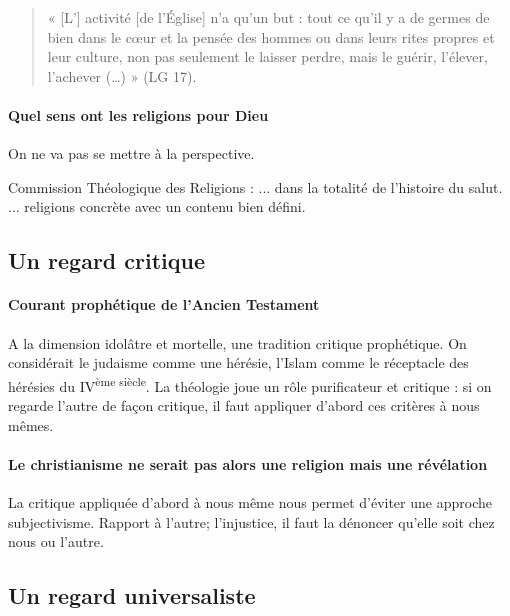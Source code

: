 \begin{quote}
    
« [L’] activité [de l’Église] n’a qu’un but : tout ce qu’il y a de germes de bien dans le cœur et la
pensée des hommes ou dans leurs rites propres et leur culture, non pas seulement le laisser perdre,
mais le guérir, l’élever, l’achever (…) » (LG 17).
\end{quote}

\paragraph{Quel sens ont les religions pour Dieu} On ne va pas se mettre à la perspective.

Commission Théologique des Religions  : ... dans la totalité de l'histoire du salut. ... religions concrète avec un contenu bien défini. 

\subsection{Un regard critique}


\paragraph{Courant prophétique de l'Ancien Testament} A la dimension idolâtre et mortelle, une tradition critique prophétique.
On considérait le judaisme comme une hérésie, l'Islam comme le réceptacle des hérésies du IV\textsuperscript{ème siècle}. La théologie joue un rôle purificateur et critique : si on regarde l'autre de façon critique, il faut appliquer d'abord ces critères à nous mêmes.

\paragraph{Le christianisme ne serait pas alors une religion mais une révélation}  La critique appliquée d'abord à nous même nous permet d'éviter une approche subjectivisme. Rapport à l'autre; l'injustice, il faut la dénoncer qu'elle soit chez nous ou l'autre.

\subsection{Un regard universaliste}


